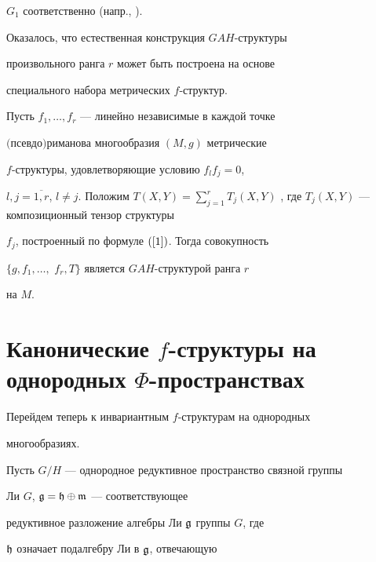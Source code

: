 $G_1$ соответственно (напр., \cite{22}).





Оказалось, что естественная конструкция $GAH$-структуры


произвольного ранга $r$ может быть построена на основе


специального набора метрических $f$-структур.





\begin{thm}


\label{T1} Пусть $f_1,\dotsc,f_r$ --- линейно независимые в каждой точке


$($псев\-до$)$ри\-ма\-нова многообразия $(M, g)$ метрические


$f$-структуры, удовлетворяющие условию $f_lf_j=0$,


$l,j=\overline{1,r}$, $l\ne j$. Положим $T(X,Y)=\sum\limits_{j=1}^r


T_j(X,Y)$ , где $T_j(X,Y)$ --- композиционный тензор структуры


$f_j$, построенный по формуле $(\ref{1})$. Тогда совокупность


$\{g, f_1,\dotsc,$ $f_r, T\}$ является $GAH$-структурой ранга $r$


на $M$.


\end{thm}








\section{Канонические $f$-структуры на однородных $\Phi$-пространствах}





Перейдем теперь к инвариантным $f$-структурам на однородных


многообразиях.





Пусть $G/H$ --- однородное редуктивное пространство связной группы


Ли $G$, $\frak{g}=\frak{h}\oplus\frak{m}$ --- соответствующее


редуктивное разложение алгебры Ли $\frak{g}$ группы $G$, где


$\frak{h}$ означает подалгебру Ли в $\frak{g}$, отвечающую


